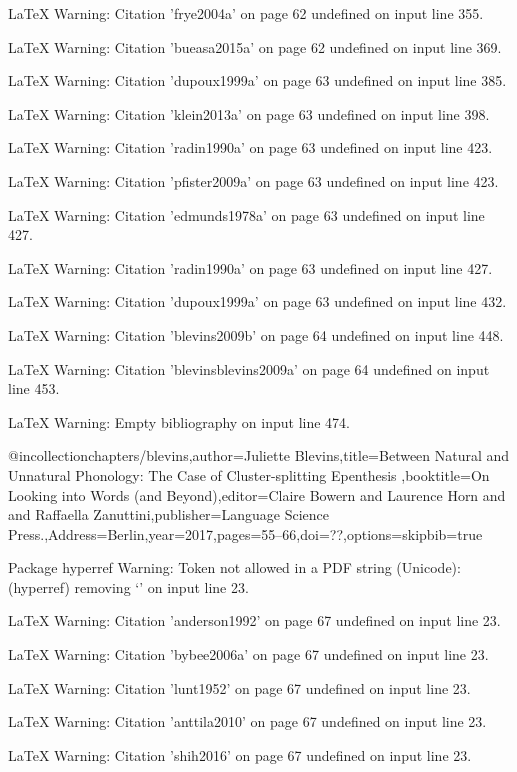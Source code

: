 LaTeX Warning: Citation 'frye2004a' on page 62 undefined on input line 355.


LaTeX Warning: Citation 'bueasa2015a' on page 62 undefined on input line 369.


LaTeX Warning: Citation 'dupoux1999a' on page 63 undefined on input line 385.


LaTeX Warning: Citation 'klein2013a' on page 63 undefined on input line 398.


LaTeX Warning: Citation 'radin1990a' on page 63 undefined on input line 423.


LaTeX Warning: Citation 'pfister2009a' on page 63 undefined on input line 423.


LaTeX Warning: Citation 'edmunds1978a' on page 63 undefined on input line 427.


LaTeX Warning: Citation 'radin1990a' on page 63 undefined on input line 427.


LaTeX Warning: Citation 'dupoux1999a' on page 63 undefined on input line 432.


LaTeX Warning: Citation 'blevins2009b' on page 64 undefined on input line 448.


LaTeX Warning: Citation 'blevinsblevins2009a' on page 64 undefined on input line 453.


LaTeX Warning: Empty bibliography on input line 474.

@incollection{chapters/blevins,author={Juliette Blevins},title={{Between Natural and Unnatural Phonology: The Case of Cluster-splitting Epenthesis }},booktitle={{On Looking into Words (and Beyond)}},editor={Claire Bowern and  Laurence Horn and  and Raffaella Zanuttini},publisher={Language Science Press.},Address={Berlin},year=2017,pages={55--66},doi={??},options={skipbib=true}}

Package hyperref Warning: Token not allowed in a PDF string (Unicode):
(hyperref)                removing `\newline' on input line 23.


LaTeX Warning: Citation 'anderson1992' on page 67 undefined on input line 23.


LaTeX Warning: Citation 'bybee2006a' on page 67 undefined on input line 23.


LaTeX Warning: Citation 'lunt1952' on page 67 undefined on input line 23.


LaTeX Warning: Citation 'anttila2010' on page 67 undefined on input line 23.


LaTeX Warning: Citation 'shih2016' on page 67 undefined on input line 23.


